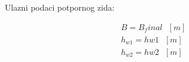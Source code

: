 \documentclass[a4paper, 12pt]{article}
\begin{document}
Ulazni podaci potpornog zida:

\begin{align*}
B = B_final \text{ } [m]\\
h_{w1} = hw1 \text{ } [m] \\
h_{w2} = hw2 \text{ } [m]
\end{align*}
\end{document}
